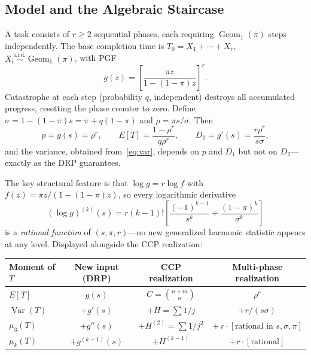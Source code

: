 \documentclass[11pt]{article}
\theoremstyle{plain}
\theoremstyle{definition}
\theoremstyle{remark}
\DeclareMathOperator{\Var}{Var}
\DeclareMathOperator{\Geom}{Geom}
\begin{document}
\subsection{Model and the Algebraic Staircase}\label{sec:mp-model}

A task consists of $r \geq 2$ sequential phases, each requiring $\Geom_1(\pi)$ steps independently.  The base completion time is $T_0 = X_1 + \cdots + X_r$, $X_i \stackrel{\text{i.i.d.}}{\sim} \Geom_1(\pi)$, with PGF
\begin{equation}\label{eq:mp-pgf}
  g(z) = \left[\frac{\pi z}{1-(1-\pi)z}\right]^{\!r}.
\end{equation}
Catastrophe at each step (probability $q$, independent) destroys all accumulated progress, resetting the phase counter to zero.  Define $\sigma = 1-(1-\pi)s = \pi + q(1-\pi)$ and $\rho = \pi s/\sigma$.  Then
\begin{equation}\label{eq:mp-p}
  p = g(s) = \rho^r, \qquad E[T] = \frac{1-\rho^r}{q\rho^r}, \qquad D_1 = g'(s) = \frac{r\rho^r}{s\sigma},
\end{equation}
and the variance, obtained from~\eqref{eq:var}, depends on $p$ and $D_1$ but not on $D_2$---exactly as the DRP guarantees.

The key structural feature is that $\log g = r\log f$ with $f(z) = \pi z/(1-(1-\pi)z)$, so every logarithmic derivative
\begin{equation}\label{eq:mp-logderiv}
  (\log g)^{(k)}(s) = r(k-1)!\left[\frac{(-1)^{k-1}}{s^k} + \frac{(1-\pi)^k}{\sigma^k}\right]
\end{equation}
is a \emph{rational function} of $(s, \pi, r)$---no new generalized harmonic statistic appears at any level.  Displayed alongside the CCP realization:

\begin{center}
\small
\renewcommand{\arraystretch}{1.2}
\begin{tabular}{lccc}
\toprule
\textbf{Moment of $T$} & \textbf{New input (DRP)} & \textbf{CCP realization} & \textbf{Multi-phase realization} \\
\midrule
$E[T]$ & $g(s)$ & $C = \binom{n+m}{n}$ & $\rho^r$ \\[2pt]
$\Var(T)$ & $+ g'(s)$ & $+ H = \sum 1/j$ & $+ r/(s\sigma)$ \\[2pt]
$\mu_3(T)$ & $+ g''(s)$ & $+ H^{(2)} = \sum 1/j^2$ & $+\, r\cdot[\text{rational in }s,\sigma,\pi]$ \\[2pt]
$\mu_k(T)$ & $+ g^{(k-1)}(s)$ & $+ H^{(k-1)}$ & $+ r \cdot [\text{rational}]$ \\
\bottomrule
\end{tabular}
\end{center}
\end{document}

